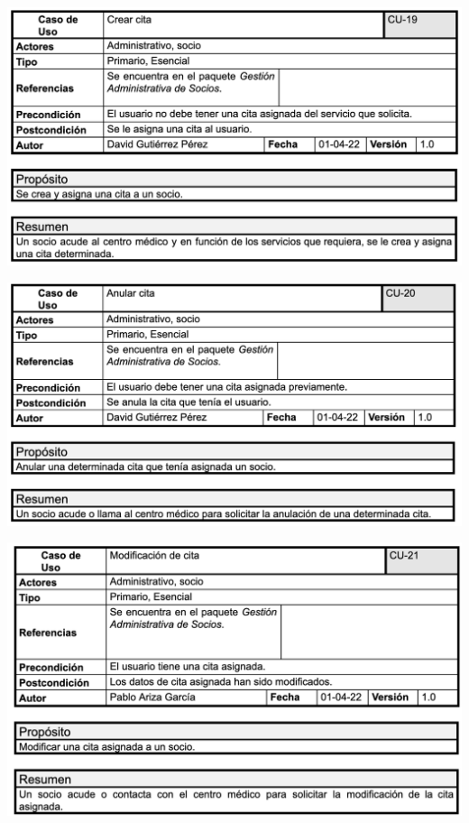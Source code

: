 \documentclass[12pt, spanish]{article}
\begin{document}
\begin{centering}\includegraphics[scale = 0.70]{casos_de_uso/19.png}\\[1.0 cm]\end{centering}
\begin{centering}\includegraphics[scale = 0.70]{casos_de_uso/20.png}\\[1.0 cm]\end{centering}
\begin{centering}\includegraphics[scale = 0.70]{casos_de_uso/21.png}\\[1.0 cm]\end{centering}
\end{document}

